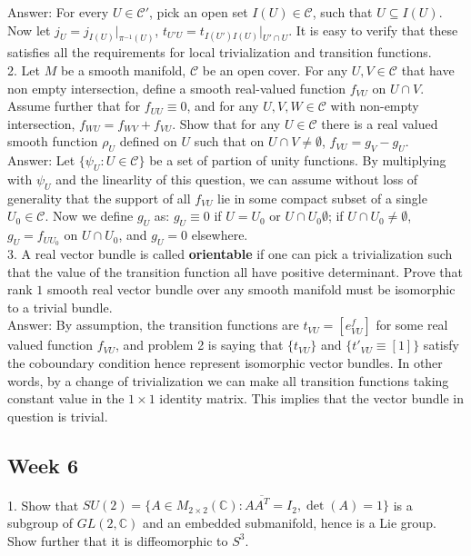 \documentclass{article}
\theoremstyle{definition}
\begin{document}
Answer: For every $U\in \mathcal{C'}$, pick an open set $I(U)\in\mathcal{C}$, such that $U\subseteq I(U)$. Now let $j_U=j_{I(U)}|_{\pi^{-1}(U)}$, $t_{U'U}=t_{I(U')I(U)}|_{U'\cap U}$. It is easy to verify that these satisfies all the requirements for local trivialization and transition functions.\\ 

2. Let $M$ be a smooth manifold, $\mathcal{C}$ be an open cover. For any $U, V\in \mathcal{C}$ that have non empty intersection, define a smooth real-valued function $f_{VU}$ on $U\cap V$. Assume further that for $f_{UU}\equiv 0$, and for any $U, V, W\in \mathcal{C}$ with non-empty intersection, $f_{WU}=f_{WV}+f_{VU}$. Show that for any $U\in \mathcal{C}$ there is a real valued smooth function $\rho_U$ defined on $U$ such that on $U\cap V\not=\emptyset$, $f_{VU}=g_V-g_U$.\\

Answer: Let $\{\psi_U: U\in\mathcal{C}\}$ be a set of partion of unity functions. By multiplying with $\psi_U$ and the linearlity of this question, we can assume without loss of generality that the support of all $f_{VU}$ lie in some compact subset of a single $U_0\in\mathcal{C}$. Now we define $g_U$ as: $g_U\equiv 0$ if $U=U_0$ or $U\cap U_0\emptyset$; if $U\cap U_0\not=\emptyset$, $g_U=f_{UU_0}$ on $U\cap U_0$, and $g_U=0$ elsewhere.\\

3. A real vector bundle is called {\bf orientable} if one can pick a trivialization such that the value of the transition function all have positive determinant. Prove that rank $1$ smooth real vector bundle over any smooth manifold must be isomorphic to a trivial bundle.\\

Answer: By assumption, the transition functions are $t_{VU}=[e^f_{VU}]$ for some real valued function $f_{VU}$, and problem 2 is saying that $\{t_{VU}\}$ and $\{t'_{VU}\equiv [1]\}$ satisfy the coboundary condition hence represent isomorphic vector bundles. In other words, by a change of trivialization we can make all transition functions taking constant value in the $1\times 1$ identity matrix. This implies that the vector bundle in question is trivial.

\subsection{Week 6}

1. Show that $SU(2)=\{A\in M_{2\times 2}(\mathbb{C}): A\overline{A^T}=I_2, \det(A)=1\}$ is a subgroup of $GL(2, \mathbb{C})$ and an embedded submanifold, hence is a Lie group. Show further that it is diffeomorphic to $S^3$.\\
\end{document}
